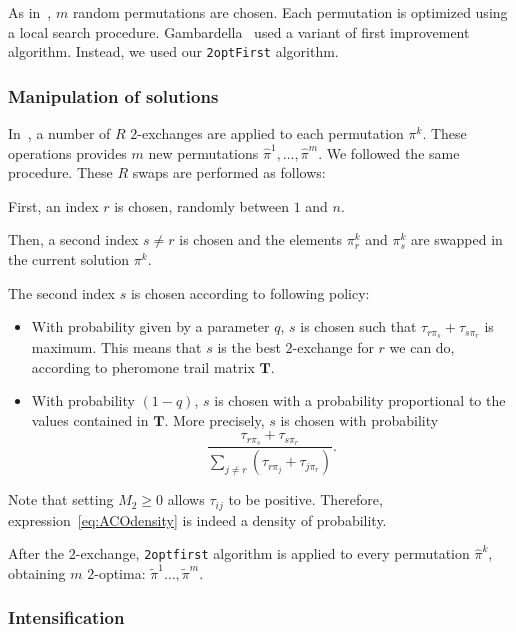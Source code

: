 As in~\cite{Gambardella1999}, $m$ random permutations are chosen. Each permutation is optimized using a local search procedure. Gambardella~\cite{Gambardella1999} used a variant of first improvement algorithm. Instead, we used our \texttt{2optFirst} algorithm.

\subsubsection{Manipulation of solutions}


In~\cite{Gambardella1999}, a number of $R$ $2$-exchanges are applied to each permutation $\pi^k$. These operations provides $m$ new permutations $\hat{\pi}^1,\dots, \hat \pi ^m$. We followed the same procedure. These $R$ swaps are performed as follows:


First, an index $r$ is chosen, randomly between $1$ and $n$.

Then, a second index $s \neq r$ is chosen and the elements $\pi^k_r$ and $\pi^k_s$ are swapped in the current solution $\pi^k$.

The second index $s$ is chosen according to following policy:
\begin{itemize}
	\item With probability given by a parameter $q$, $s$ is chosen such that $\tau_{r\pi_s}+\tau_{s \pi_r}$ is maximum. This means that $s$ is the best $2$-exchange for $r$ we can do, according to pheromone trail matrix $\bm T$.
	\item With probability $(1-q)$, $s$ is chosen with a probability proportional to the values contained in $\bm T$. More precisely, $s$ is chosen with probability
	\begin{equation}
	\label{eq:ACOdensity}
	\frac{\tau_{r\pi_s}+\tau_{s \pi_r}}{\sum_{j \neq r}\left(\tau_{r\pi_j}+\tau_{j \pi_r}\right)}.
	\end{equation}
\end{itemize}
Note that setting $M_2\ge 0$ allows $\tau_{ij}$ to be positive. Therefore,  expression~\eqref{eq:ACOdensity} is indeed a density of probability.  

After the $2$-exchange, \texttt{2optfirst} algorithm is applied to every permutation $\hat{\pi}^k$, obtaining $m$ $2$-optima: $\tilde{\pi}^1\dots, \tilde{\pi}^m$.

\subsubsection{Intensification}


